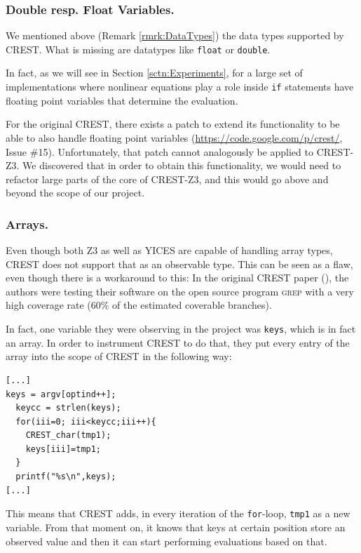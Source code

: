 \documentclass[oribibl]{llncs}
\begin{document}
\subsubsection{Double resp. Float Variables.}
\label{sbsbsctn:dblrespfloat}

We mentioned above (Remark \ref{rmrk:DataTypes}) the data types supported by \textsc{CREST}. What is
missing are datatypes like \texttt{float} or \texttt{double}.

In fact, as we will see in Section \ref{sctn:Experiments}, for a large set
of implementations where nonlinear equations play a role inside \texttt{if}
statements have floating point variables that determine the
evaluation.

For the original \textsc{CREST}, there exists a patch to extend its
functionality to be able to also handle floating point variables
(\url{https://code.google.com/p/crest/}, Issue \#15). Unfortunately, that
patch cannot analogously be applied to
\textsc{CREST-Z3}. We discovered that in order to obtain this functionality, we
would need to refactor large parts of the core of \textsc{CREST-Z3},
and this would go above and beyond the scope of our project.

\subsubsection{Arrays.}

Even though both \textsc{Z3} as well as \textsc{YICES} are capable of
handling array types, \textsc{CREST} does not support that as an
observable type. This can be seen as a flaw, even though there is a
workaround to this: In the original \textsc{CREST} paper
(\cite{CREST}), the authors were testing their software on the open
source program \textsc{grep} with a very high coverage rate (60\% of
the estimated coverable branches).

In fact, one variable they were observing in the project was \texttt{keys}, which is in fact an array. In order to
instrument \textsc{CREST} to do that, they put every entry of the
array into the scope of \textsc{CREST} in the following way:

\begin{verbatim}
[...]
keys = argv[optind++];
  keycc = strlen(keys);
  for(iii=0; iii<keycc;iii++){
    CREST_char(tmp1);
    keys[iii]=tmp1;
  }
  printf("%s\n",keys);
[...]
\end{verbatim}

This means that \textsc{CREST} adds, in every iteration of the
\texttt{for}-loop, \texttt{tmp1} as a new variable. From that moment on, it
knows that keys at certain position store an observed value and then
it can start performing evaluations based on that.
\end{document}
